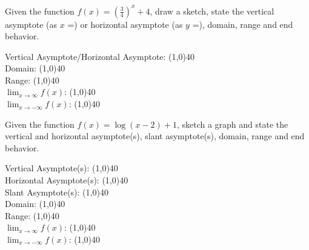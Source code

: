 \documentclass[../main.tex]{subfiles}
\begin{document}
\begin{questions}
    \newpage
    \question[1] Given the function $f(x) = (\frac{3}{4})^x + 4$, draw a sketch, state the vertical asymptote (as $x$ =) or horizontal asymptote (as $y$ =), domain, range and end behavior.
    
        \begin{left} 
        \end{left}
    
    Vertical Asymptote/Horizontal Asymptote: \line(1,0){40} \\
    \newline
    Domain: \line(1,0){40} \\
    \newline
    Range: \line(1,0){40} \\
    \newline
    $\lim_{x\to\infty} f(x)$: \line(1,0){40} \\
    \newline
    $\lim_{x\to-\infty} f(x)$: \line(1,0){40} \\
    
    \question[1] Given the function $f(x) = \log (x-2) + 1$, sketch a graph and state the vertical and horizontal asymptote(s), slant asymptote(s), domain, range and end behavior.
    
        \begin{left} 
        \end{left}
    
    Vertical Asymptote(s): \line(1,0){40} \\
    \newline
    Horizontal Asymptote(s): \line(1,0){40} \\
    \newline
    Slant Asymptote(s): \line(1,0){40} \\
    \newline
    Domain: \line(1,0){40} \\
    \newline
    Range: \line(1,0){40} \\
    \newline
    $\lim_{x\to\infty} f(x)$: \line(1,0){40} \\
    \newline
    $\lim_{x\to-\infty} f(x)$: \line(1,0){40} \\
    

\end{questions}
\end{document}

